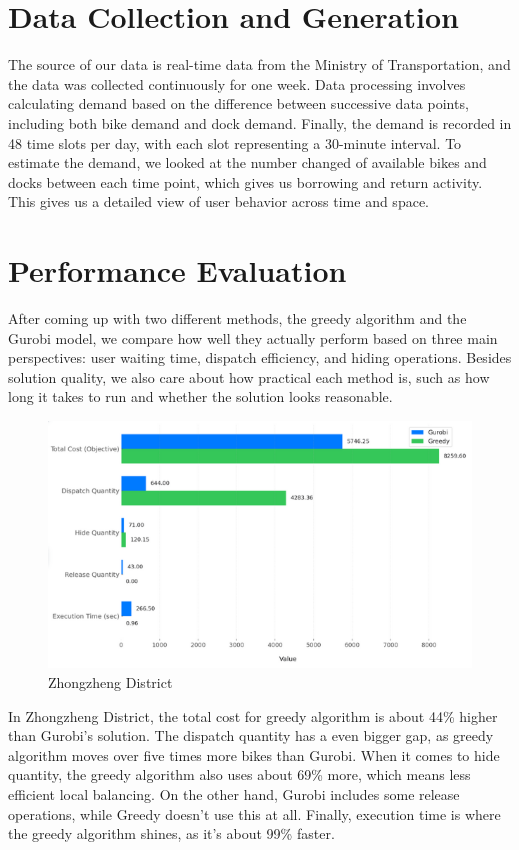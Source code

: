 \documentclass[11pt,a4paper]{article}
\begin{document}
\section{Data Collection and Generation}

The source of our data is real-time data from the Ministry of Transportation, and the data was collected continuously for one week.
Data processing involves calculating demand based on the difference between successive data points, including both bike demand and dock demand.
Finally, the demand is recorded in 48 time slots per day, with each slot representing a 30-minute interval.
To estimate the demand, we looked at the number changed of available bikes and docks between each time point, which gives us borrowing and return activity. This gives us a detailed view of user behavior across time and space.

\newpage
\section{Performance Evaluation}

After coming up with two different methods, the greedy algorithm and the Gurobi model, we compare how well they actually perform based on three main perspectives: user waiting time, dispatch efficiency, and hiding operations.
Besides solution quality, we also care about how practical each method is, such as how long it takes to run and whether the solution looks reasonable.

\begin{figure}[H]
\centering
\includegraphics{Zhongzheng.png}
\caption{Zhongzheng District}
\label{Figure 1}
\end{figure}

In Zhongzheng District, the total cost for greedy algorithm is about 44\% higher than Gurobi’s solution. The dispatch quantity has a even bigger gap, as greedy algorithm moves over five times more bikes than Gurobi. When it comes to hide quantity, the greedy algorithm also uses about 69\% more, which means less efficient local balancing. On the other hand, Gurobi includes some release operations, while Greedy doesn’t use this at all. Finally, execution time is where the greedy algorithm shines, as it’s about 99\% faster.
\end{document}
